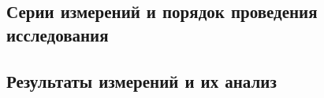 \subsection{Серии измерений и порядок проведения исследования}
\label{subsec:measurement-series}


\subsection{Результаты измерений и их анализ}
\label{subsec:experiment-results}

